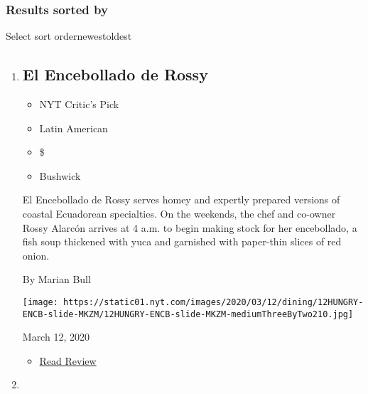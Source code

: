 \hypertarget{results--sorted-by-}{%
\subsubsection{\texorpdfstring{Results sorted by
}{Results  sorted by }}\label{results--sorted-by-}}

Select sort ordernewestoldest

\begin{enumerate}
\def\labelenumi{\arabic{enumi}.}
\item
  \href{https://www.nytimes.com/2020/03/12/dining/el-encebollado-de-rossy-review.html}{}

  \hypertarget{el-encebollado-de-rossy}{%
  \subsection{El Encebollado de Rossy}\label{el-encebollado-de-rossy}}

  \begin{itemize}
  \tightlist
  \item
    NYT Critic's Pick
  \item
    Latin American
  \item
    \$
  \item
    Bushwick
  \end{itemize}

  El Encebollado de Rossy serves homey and expertly prepared versions of
  coastal Ecuadorean specialties. On the weekends, the chef and co-owner
  Rossy Alarcón arrives at 4 a.m. to begin making stock for her
  encebollado, a fish soup thickened with yuca and garnished with
  paper-thin slices of red onion.

  By Marian Bull

  \texttt{[image: https://static01.nyt.com/images/2020/03/12/dining/12HUNGRY-ENCB-slide-MKZM/12HUNGRY-ENCB-slide-MKZM-mediumThreeByTwo210.jpg]}

  March 12, 2020

  \begin{itemize}
  \tightlist
  \item
    \href{https://www.nytimes.com/2020/03/12/dining/el-encebollado-de-rossy-review.html?rref=collection\%2Fcollection\%2Frestaurant-guide}{Read
    Review}
  \end{itemize}
\item
  \href{https://www.nytimes.com/2020/03/10/dining/pastrami-masters-review-pete-wells.html}{}

  \hypertarget{pastrami-masters}{%
}
\end{enumerate}
